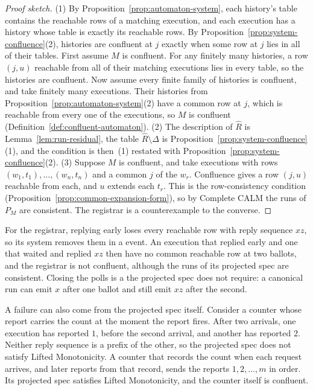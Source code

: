 \begin{proof}[Proof sketch]
(1) By Proposition~\ref{prop:automaton-system}, each history's table contains
the reachable rows of a matching execution, and each execution has a history
whose table is exactly its reachable rows.  By
Proposition~\ref{prop:system-confluence}(2), histories are confluent at $j$
exactly when some row at $j$ lies in all of their tables.  First assume $M$ is
confluent.  For any finitely many histories, a row $(j,u)$ reachable from all
of their matching executions lies in every table, so the histories are
confluent.  Now assume every finite family of histories is confluent, and take
finitely many executions.  Their histories from
Proposition~\ref{prop:automaton-system}(2) have a common row at $j$, which is
reachable from every one of the executions, so $M$ is confluent
(Definition~\ref{def:confluent-automaton}).  (2) The description of
$\widehat R$ is Lemma~\ref{lem:run-residual}, the table $\widehat R\setminus\Delta$
is Proposition~\ref{prop:system-confluence}(1), and the condition is then~(1)
restated with Proposition~\ref{prop:system-confluence}(2).  (3) Suppose $M$ is
confluent, and take executions with rows $(w_1,t_1),\ldots,(w_n,t_n)$ and a
common \indesc $j$ of the $w_r$.  Confluence gives a row $(j,u)$ reachable from
each, and $u$ extends each $t_r$.  This is the row-consistency condition
(Proposition~\ref{prop:common-expansion-form}), so by Complete CALM the runs of
$P_M$ are consistent.  The registrar is a counterexample to the converse.
\end{proof}

For the registrar, replying early loses every reachable row with reply
sequence $xz$, so its system removes them in a \commitment event.  An execution
that replied early and one that waited and replied $xz$ then have no common
reachable row at two ballots, and the registrar is not confluent, although the
runs of its projected spec are consistent.  Closing the polls is a \commitment the projected
spec does not require: a canonical run can emit $x$ after one ballot and still
emit $xz$ after the second.

A failure can also come from the projected spec itself.  Consider a counter
whose report carries the count at the moment the report fires.  After two
arrivals, one execution has reported $1$, before the second arrival, and
another has reported $2$.  Neither reply sequence is a prefix of the other, so
the projected spec does not satisfy Lifted Monotonicity.  A counter that records the count when each
request arrives, and later reports from that record, sends the reports
$1,2,\ldots,m$ in order.  Its projected spec satisfies Lifted Monotonicity, and the counter
itself is confluent.

